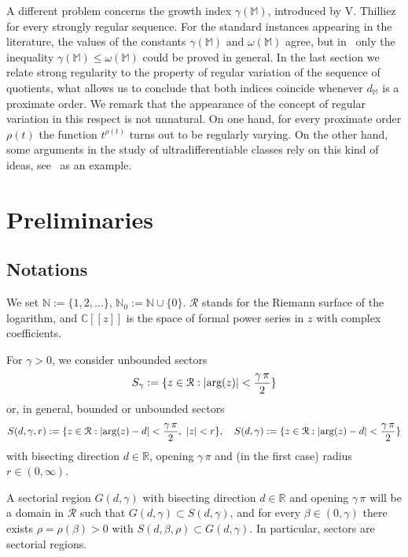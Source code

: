 \documentclass[11pt,a4paper]{article}
\theoremstyle{definition}
\def\ga{\gamma}
\def\N{\mathbb{N}}
\def\R{\mathbb{R}}
\def\C{\mathbb{C}}      %
\def\M{\mathbb{M}}
\begin{document}
A different problem concerns the growth index $\gamma(\M)$, introduced by V. Thilliez~\cite{thilliez} for every strongly regular sequence. For the standard instances appearing in the literature, the values of the constants $\ga(\M)$ and $\omega(\M)$ agree, but in~\cite{SanzFlat} only the inequality $\ga(\M)\le \omega(\M)$ could be proved in general. In the last section we relate strong regularity to the property of regular variation of the sequence of quotients, what allows us to conclude that both indices coincide whenever $d_{\M}$ is a proximate order. We remark that the appearance of the concept of regular variation in this respect is not unnatural. On one hand, for every proximate order $\rho(t)$ the function $t^{\rho(t)}$ turns out to be regularly varying.
On the other hand, some arguments in the study of ultradifferentiable classes rely on this kind of ideas, see~\cite{bonetmeisemelikhov} as an example.




\section{Preliminaries}


\subsection{Notations}
We set $\N:=\{1,2,...\}$, $\N_{0}:=\N\cup\{0\}$.
$\mathcal{R}$ stands for the Riemann surface of the logarithm, and
$\C[[z]]$ is the space of formal power series in $z$ with complex coefficients.\par\noindent
For $\gamma>0$, we consider unbounded sectors
$$S_{\gamma}:=\{z\in\mathcal{R}:|\hbox{arg}(z)|<\frac{\gamma\,\pi}{2}\}$$
or, in general, bounded or unbounded sectors
$$S(d,\gamma,r):=\{z\in\mathcal{R}:|\hbox{arg}(z)-d|<\frac{\gamma\,\pi}{2},\ |z|<r\},\quad
S(d,\gamma):=\{z\in\mathcal{R}:|\hbox{arg}(z)-d|<\frac{\gamma\,\pi}{2}\}$$
with bisecting direction $d\in\R$, opening $\gamma \,\pi$ and (in the first case) radius $r\in(0,\infty)$.\par\noindent

A sectorial region $G(d,\gamma)$ with bisecting direction $d\in\R$ and opening $\gamma\,\pi$ will be a domain in $\mathcal{R}$ such that $G(d,\gamma)\subset S(d,\gamma)$, and for every $\beta\in(0,\gamma)$ there exists $\rho=\rho(\beta)>0$ with $S(d,\beta,\rho)\subset G(d,\gamma)$.
In particular, sectors are sectorial regions.\par\noindent
\end{document}
